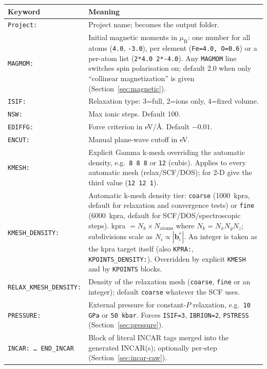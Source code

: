 \documentclass[11pt,a4paper]{scrartcl}
\newcommand{\thead}{\rowcolor{lightblue}}
\begin{document}
\begin{tabularx}{\linewidth}{@{}lX@{}}
\thead
Keyword & Meaning \\ \midrule
\texttt{Project:} & Project name; becomes the output folder. \\
\texttt{MAGMOM:} & Initial magnetic moments in $\mu_{\mathrm{B}}$: one number
  for all atoms (\texttt{4.0}, \texttt{-3.0}), per element
  (\texttt{Fe=4.0, O=0.6}) or a per-atom list (\texttt{2*4.0 2*-4.0}).
  Any \texttt{MAGMOM} line switches spin polarisation on; default 2.0 when only
  ``collinear magnetization'' is given (Section~\ref{sec:magnetic}). \\
\texttt{ISIF:} & Relaxation type: 3=full, 2=ions only, 4=fixed volume. \\
\texttt{NSW:} & Max ionic steps. Default 100. \\
\texttt{EDIFFG:} & Force criterion in eV/\AA. Default $-0.01$. \\
\texttt{ENCUT:} & Manual plane-wave cutoff in eV. \\
\texttt{KMESH:} & Explicit Gamma k-mesh overriding the automatic density,
  e.g.\ \texttt{8 8 8} or \texttt{12} (cubic).  Applies to every automatic
  mesh (relax/SCF/DOS); for 2-D give the third value (\texttt{12 12 1}). \\
\texttt{KMESH\_DENSITY:} & Automatic k-mesh density tier: \texttt{coarse}
  (1000~kpra, default for relaxation and convergence tests) or \texttt{fine}
  (6000~kpra, default for SCF/DOS/spectroscopic steps).  kpra $= N_k \times
  N_\mathrm{atoms}$ where $N_k = N_x N_y N_z$; subdivisions scale as
  $N_i \propto |\mathbf{b}_i^*|$.  An integer is taken as the kpra target
  itself (also \texttt{KPRA:}, \texttt{KPOINTS\_DENSITY:}).  Overridden by
  explicit \texttt{KMESH} and by \texttt{KPOINTS} blocks. \\
\texttt{RELAX\_KMESH\_DENSITY:} & Density of the relaxation mesh
  (\texttt{coarse}, \texttt{fine} or an integer); default \texttt{coarse}
  whatever the SCF uses. \\
\texttt{PRESSURE:} & External pressure for constant-$P$ relaxation, e.g.\
  \texttt{10 GPa} or \texttt{50 kbar}.  Forces \texttt{ISIF=3},
  \texttt{IBRION=2}, \texttt{PSTRESS} (Section~\ref{sec:pressure}). \\
\texttt{INCAR: \ldots\ END\_INCAR} & Block of literal INCAR tags merged
  into the generated INCAR(s); optionally per-step
  (Section~\ref{sec:incar-raw}). \\
\bottomrule
\end{tabularx}
\end{document}
